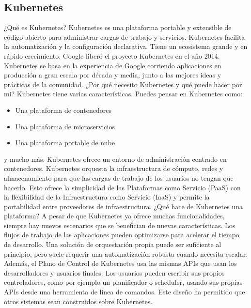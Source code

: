 \documentclass[12pt]{article}
\begin{document}
\subsection*{Kubernetes}
¿Qué es Kubernetes?
Kubernetes es una plataforma portable y extensible de código abierto para administrar cargas de trabajo y servicios. Kubernetes facilita la automatización y la configuración declarativa. Tiene un ecosistema grande y en rápido crecimiento. 
Google liberó el proyecto Kubernetes en el año 2014. Kubernetes se basa en la experiencia de Google corriendo aplicaciones en producción a gran escala por década y media, junto a las mejores ideas y prácticas de la comunidad.
¿Por qué necesito Kubernetes y qué puede hacer por mi?
Kubernetes tiene varias características. Puedes pensar en Kubernetes como:
\begin{itemize}
\item Una plataforma de contenedores
\item Una plataforma de microservicios
\item Una plataforma portable de nube
\end{itemize}
y mucho más.
Kubernetes ofrece un entorno de administración centrado en contenedores. Kubernetes orquesta la infraestructura de cómputo, redes y almacenamiento para que las cargas de trabajo de los usuarios no tengan que hacerlo. Esto ofrece la simplicidad de las Plataformas como Servicio (PaaS) con la flexibilidad de la Infraestructura como Servicio (IaaS) y permite la portabilidad entre proveedores de infraestructura.
¿Qué hace de Kubernetes una plataforma?
A pesar de que Kubernetes ya ofrece muchas funcionalidades, siempre hay nuevos escenarios que se benefician de nuevas características. Los flujos de trabajo de las aplicaciones pueden optimizarse para acelerar el tiempo de desarrollo. Una solución de orquestación propia puede ser suficiente al principio, pero suele requerir una automatización robusta cuando necesita escalar. 
Además, el Plano de Control de Kubernetes usa las mismas APIs que usan los desarrolladores y usuarios finales. Los usuarios pueden escribir sus propios controladores, como por ejemplo un planificador o scheduler, usando sus propias APIs desde una herramienta de línea de comandos.
Este diseño ha permitido que otros sistemas sean construidos sobre Kubernetes.
\end{document}
